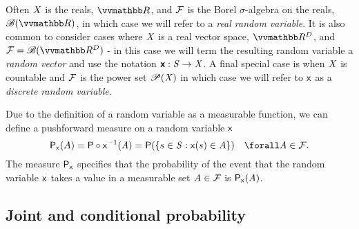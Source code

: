 Often $\mathit{X}$ is the reals, $\reals$, and $\mathcal{F}$ is the Borel $\sigma$-algebra on the reals, $\borel(\reals)$, in which case we will refer to a \emph{real random variable}. It is also common to consider cases where $\mathit{X}$ is a real vector space, $\reals^D$, and $\sset{F} = \borel(\reals^D)$ - in this case we will term the resulting random variable a \emph{random vector} and use the notation $\boldsymbol{\mathsf{x}} : \mathit{S} \to \mathit{X}$. A final special case is when $\mathit{X}$ is countable and $\mathcal{F}$ is the power set $\mathscr{P}(\mathit{X})$ in which case we will refer to $\mathsf{x}$ as a \emph{discrete random variable}.

Due to the definition of a random variable as a measurable function, we can define a pushforward measure on a random variable $\mathsf{x}$
\begin{equation}
  \prob{\rvar{x}}(A) 
  = \probability\circ\rvar{x}^{-1}(\set{A})
  = \probability\lpa \lbr s \in \set{S}: \rvar{x}(s) \in A \rbr \rpa
  \quad \forall \set{A} \in \sset{F}.
\end{equation}
The measure $\mathsf{P}_{\mathsf{x}}$ specifies that the probability of the event that the random variable $\mathsf{x}$ takes a value in a measurable set $\mathit{A} \in \mathcal{F}$ is $\mathsf{P}_{\mathsf{x}}(\mathit{A})$.


\subsection{Joint and conditional probability}\label{subsec:joint-and-conditional-probabilities}

